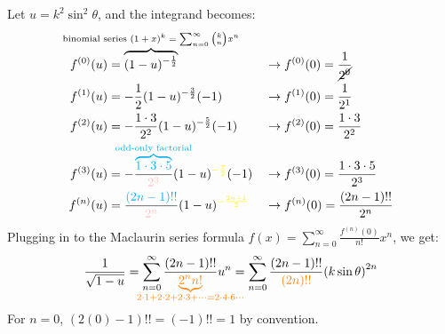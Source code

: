 \documentclass[preview]{standalone}
\begin{document}
\color{white}

Let $u = k^2 \sin^2 \theta$, and the integrand becomes:
\begin{align*}
  f^{(0)}(u) &=
  \overbrace{(1-u)^{-\frac{1}{2}}}^{\mathclap{\text{binomial series $(1+x)^k =
  \sum_{n=0}^{\infty} \binom{k}{n} x^n$}}} &&\rightarrow f^{(0)}(0) =
  \frac{1}{\cancel{2^0}} \\
  f^{(1)}(u) &= -\frac{1}{2} (1-u)^{-\frac{3}{2}} (-1) &&\rightarrow
  f^{(1)}(0) = \frac{1}{2^1} \\
  f^{(2)}(u) &= -\frac{1\cdot3}{2^2} (1-u)^{-\frac{5}{2}} (-1)
  &&\rightarrow f^{(2)}(0) = \frac{1\cdot3}{2^2} \\
  f^{(3)}(u) &=
  -\frac{\color{cyan}\overbrace{1\cdot3\cdot5}^{\mathclap{\text{odd-only
  factorial}}}}{\color{pink}2^3} (1-u)^{\color{yellow} -\frac{7}{2}} (-1)
  &&\rightarrow f^{(3)}(0) =
  \frac{1\cdot3\cdot5}{2^3} \\
  f^{(n)}(u) &= \frac{{\color{cyan}(2n-1)!!}}{{\color{pink}2^n}}
  (1-u)^{\color{yellow} -\frac{2n+1}{2}}
  &&\rightarrow f^{(n)}(0) = \frac{{(2n-1)!!}}{{2^n}}
\end{align*}
Plugging in to the Maclaurin series formula $f(x) =
\sum_{n=0}^{\infty} \frac{f^{(n)}(0)}{n!} x^n$, we get:
\[
  \frac{1}{\sqrt{1 - u}} = \sum_{n=0}^{\infty} \frac{
  (2n-1)!!}{\color{orange}\underbrace{2^n n!}_{\mathclap{2 \cdot 1 +
  2 \cdot 2 + 2 \cdot 3 + \cdots = 2 \cdot 4 \cdot 6 \cdots}}} u^n =
  \sum_{n=0}^{\infty} \frac{ (2n-1)!!}{\color{orange} (2n)!!}
  {\left(k\sin\theta\right)}^{2n}
\]
For $n = 0$, $(2(0) - 1)!! = (-1)!! = 1$ by
convention.
\end{document}
